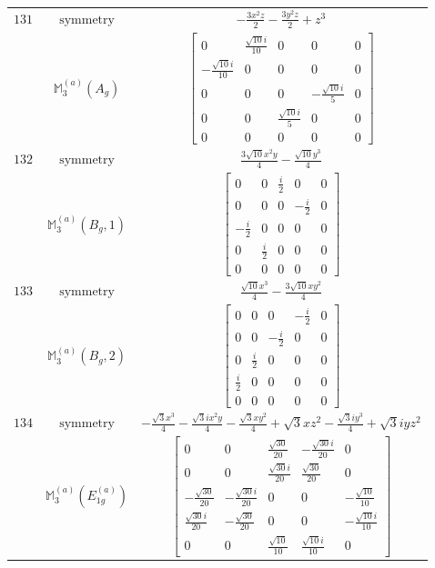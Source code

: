 \documentclass[fleqn,8pt,landscape]{jsarticle}
\begin{document}
\begin{longtable}{ccc}
$ 131 $ & $ \text{symmetry} $ & $ - \frac{3 x^{2} z}{2} - \frac{3 y^{2} z}{2} + z^{3} $ \\
$  $ & $ \mathbb{M}_{3}^{(a)}(A_{g}) $ & $ \begin{bmatrix} 0 & \frac{\sqrt{10} i}{10} & 0 & 0 & 0 \\ - \frac{\sqrt{10} i}{10} & 0 & 0 & 0 & 0 \\ 0 & 0 & 0 & - \frac{\sqrt{10} i}{5} & 0 \\ 0 & 0 & \frac{\sqrt{10} i}{5} & 0 & 0 \\ 0 & 0 & 0 & 0 & 0 \end{bmatrix} $ \\ \hline
$ 132 $ & $ \text{symmetry} $ & $ \frac{3 \sqrt{10} x^{2} y}{4} - \frac{\sqrt{10} y^{3}}{4} $ \\
$  $ & $ \mathbb{M}_{3}^{(a)}(B_{g},1) $ & $ \begin{bmatrix} 0 & 0 & \frac{i}{2} & 0 & 0 \\ 0 & 0 & 0 & - \frac{i}{2} & 0 \\ - \frac{i}{2} & 0 & 0 & 0 & 0 \\ 0 & \frac{i}{2} & 0 & 0 & 0 \\ 0 & 0 & 0 & 0 & 0 \end{bmatrix} $ \\ \hline
$ 133 $ & $ \text{symmetry} $ & $ \frac{\sqrt{10} x^{3}}{4} - \frac{3 \sqrt{10} x y^{2}}{4} $ \\
$  $ & $ \mathbb{M}_{3}^{(a)}(B_{g},2) $ & $ \begin{bmatrix} 0 & 0 & 0 & - \frac{i}{2} & 0 \\ 0 & 0 & - \frac{i}{2} & 0 & 0 \\ 0 & \frac{i}{2} & 0 & 0 & 0 \\ \frac{i}{2} & 0 & 0 & 0 & 0 \\ 0 & 0 & 0 & 0 & 0 \end{bmatrix} $ \\ \hline
$ 134 $ & $ \text{symmetry} $ & $ - \frac{\sqrt{3} x^{3}}{4} - \frac{\sqrt{3} i x^{2} y}{4} - \frac{\sqrt{3} x y^{2}}{4} + \sqrt{3} x z^{2} - \frac{\sqrt{3} i y^{3}}{4} + \sqrt{3} i y z^{2} $ \\
$  $ & $ \mathbb{M}_{3}^{(a)}(E_{1g}^{(a)}) $ & $ \begin{bmatrix} 0 & 0 & \frac{\sqrt{30}}{20} & - \frac{\sqrt{30} i}{20} & 0 \\ 0 & 0 & \frac{\sqrt{30} i}{20} & \frac{\sqrt{30}}{20} & 0 \\ - \frac{\sqrt{30}}{20} & - \frac{\sqrt{30} i}{20} & 0 & 0 & - \frac{\sqrt{10}}{10} \\ \frac{\sqrt{30} i}{20} & - \frac{\sqrt{30}}{20} & 0 & 0 & - \frac{\sqrt{10} i}{10} \\ 0 & 0 & \frac{\sqrt{10}}{10} & \frac{\sqrt{10} i}{10} & 0 \end{bmatrix} $ \\ \hline

\end{longtable}
\end{document}
